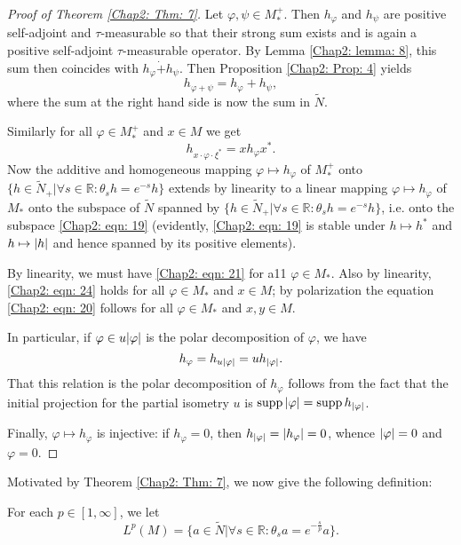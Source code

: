 \begin{proof}[Proof of Theorem \ref{Chap2: Thm: 7}]
    Let $\varphi,\psi\in M_*^+$. Then $h_\varphi$ and $h_\psi$ are positive self-adjoint and $\tau$-measurable so that their strong sum exists and is again a positive self-adjoint $\tau$-measurable operator. By Lemma \ref{Chap2: lemma: 8}, this sum then coincides with $h_\varphi\dot{+}h_\psi$. Then Proposition \ref{Chap2: Prop: 4} yields 
\[
  h_{\varphi+\psi}=h_\varphi+h_\psi,  
\]
where the sum at the right hand side is now the sum in $\tilde{N}$.\par 
Similarly for all $\varphi\in M_*^+$ and $x\in M$ we get 
\begin{equation}\label{Chap2: eqn: 24}
    h_{x\cdot \varphi\cdot \xi^*}=xh_\varphi x^*.
\end{equation}
Now the additive and homogeneous mapping $\varphi\mapsto h_\varphi$ of $M_*^+$ onto $\{h\in \tilde{N}_+|\forall s\in \mathbb{R}:\theta_sh=e^{-s}h\}$ extends by linearity to a linear mapping $\varphi\mapsto h_\varphi$ of $M_*$ onto the subspace of $\tilde{N}$ spanned by $\{h\in \tilde{N}_+|\forall s\in \mathbb{R}:\theta_sh=e^{-s}h\}$, i.e. onto the subspace \eqref{Chap2: eqn: 19} (evidently, \eqref{Chap2: eqn: 19} is stable under $h\mapsto h^*$ and $h\mapsto\abs{h}$ and hence spanned by its positive elements).\par 
By linearity, we must have \eqref{Chap2: eqn: 21} for a11 $\varphi\in M_*$. Also by linearity, \eqref{Chap2: eqn: 24} holds for all $\varphi\in M_*$ and $x\in M$; by polarization the equation \eqref{Chap2: eqn: 20} follows for all $\varphi\in M_*$ and $x,y\in M$.\par 
In particular, if $\varphi\in u\abs{\varphi}$ is the polar decomposition of $\varphi$, we have 
\[
    h_\varphi=h_{u\abs{\varphi}}=uh_{\abs{\varphi}}.
\]
That this relation is the polar decomposition of $h_\varphi$ follows from the fact that the initial projection for the partial isometry $u$ is $\operatorname{supp} \abs{\varphi}=\operatorname{supp} h_\abs{\varphi}$.\par 
Finally, $\varphi\mapsto h_\varphi$ is injective: if $h_\varphi=0$, then $h_{\abs{\varphi}}=\abs{h_\varphi}=0$, whence $\abs{\varphi}=0$ and $\varphi=0$.
\end{proof}
Motivated by Theorem \ref{Chap2: Thm: 7}, we now give the following definition:
\begin{definition}\label{Chap2: Def: 9}
    For each $p\in [1,\infty]$, we let
    \[
        L^p(M)=\{a\in \tilde{N}|\forall s\in \mathbb{R}:\theta_s a=e^{-\frac{s}{p}}a\}.
    \] 
\end{definition}
